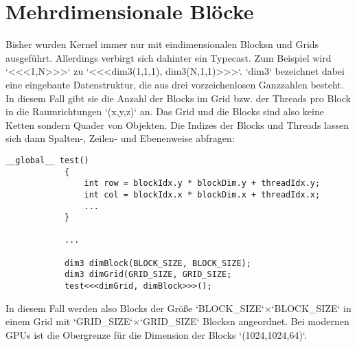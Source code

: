 		\section{Mehrdimensionale Bl\"ocke}
		Bisher wurden \Gls{Kernel} immer nur mit eindimensionalen \Glspl{Block}n und \Glspl{Grid} ausgeführt. Allerdings verbirgt sich dahinter ein Typecast. Zum Beispiel wird \li`<<<1,N>>>` zu \li`<<<dim3(1,1,1), dim3(N,1,1)>>>`. \li`dim3` bezeichnet dabei eine eingebaute Datenstruktur, die aus drei vorzeichenlosen Ganzzahlen besteht. In diesem Fall gibt sie die Anzahl der \Glspl{Block} im \Gls{Grid} bzw. der \Glspl{Thread} pro \Gls{Block} in die Raumrichtungen \li`(x,y,z)` an. Das \Gls{Grid} und die \Glspl{Block} sind also keine Ketten sondern Quader von Objekten. Die Indizes der \Glspl{Block} und \Glspl{Thread} lassen sich dann Spalten-, Zeilen- und Ebenenweise abfragen: 			
		\begin{lstlisting}[caption=Multidimensionale Blöcke]
			__global__ test()
			{
				int row = blockIdx.y * blockDim.y + threadIdx.y;
				int col = blockIdx.x * blockDim.x + threadIdx.x;
				...
			}
    		
    		...

		    dim3 dimBlock(BLOCK_SIZE, BLOCK_SIZE);
    		dim3 dimGrid(GRID_SIZE, GRID_SIZE;
    		test<<<dimGrid, dimBlock>>>();
		\end{lstlisting}
        In diesem Fall werden also \Glspl{Block} der Größe \li`BLOCK_SIZE`$\times$\li`BLOCK_SIZE` in einem \Gls{Grid} mit \li`GRID_SIZE`$\times$\li`GRID_SIZE` \Glspl{Block}n angeordnet. Bei modernen GPUs ist die Obergrenze für die Dimension der \Glspl{Block} \li`(1024,1024,64)`.
        
